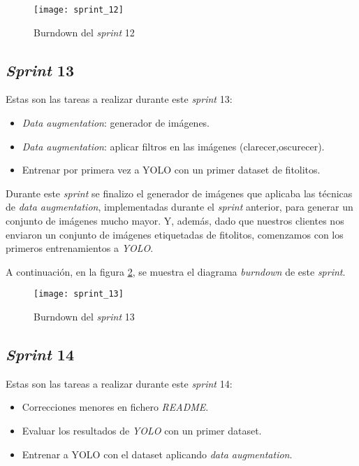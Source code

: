 \begin{figure}
\centering
\texttt{[image: sprint\_12]}
\caption{Burndown del \textit{sprint} 12}
\label{fig:A.1.13}
\end{figure}

\subsection{\textit{Sprint} 13}

Estas son las tareas a realizar durante este \textit{sprint} 13:

\begin{itemize}
	\item \textit{Data augmentation}: generador de imágenes.
	\item \textit{Data augmentation}: aplicar filtros en las imágenes (clarecer,oscurecer).
	\item Entrenar por primera vez a YOLO con un primer dataset de fitolitos.
\end{itemize}

Durante este \textit{sprint} se finalizo el generador de imágenes que aplicaba las técnicas de \textit{data augmentation}, implementadas durante el \textit{sprint} anterior, para generar un conjunto de imágenes mucho mayor. Y, además, dado que nuestros clientes nos enviaron un conjunto de imágenes etiquetadas de fitolitos, comenzamos con los primeros entrenamientos a \textit{YOLO}.

A continuación, en la figura \ref{fig:A.1.14}, se muestra el diagrama \textit{burndown} de este \textit{sprint}.

\begin{figure}
\centering
\texttt{[image: sprint\_13]}
\caption{Burndown del \textit{sprint} 13}
\label{fig:A.1.14}
\end{figure}

\subsection{\textit{Sprint} 14}

Estas son las tareas a realizar durante este \textit{sprint} 14:

\begin{itemize}
	\item Correcciones menores en fichero \textit{README}.
	\item Evaluar los resultados de \textit{YOLO} con un primer dataset.
	\item Entrenar a YOLO con el dataset aplicando \textit{data augmentation}.
\end{itemize}

